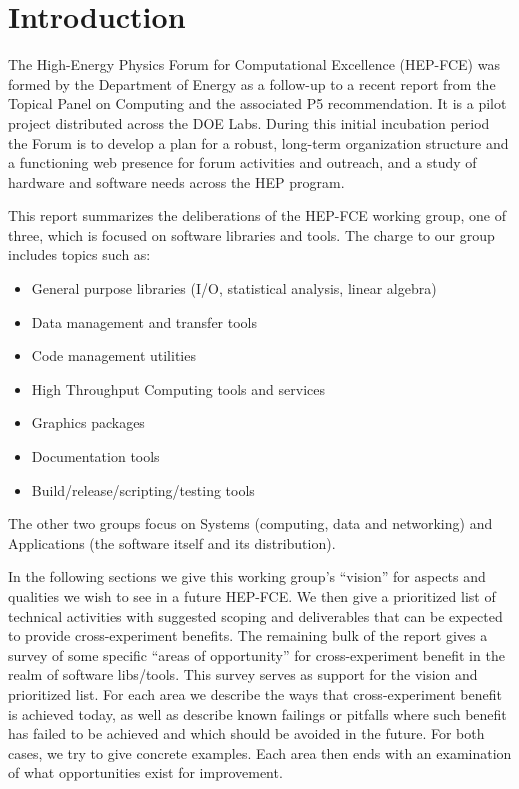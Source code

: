 \section{Introduction}

The High-Energy Physics Forum for Computational Excellence (HEP-FCE)
was formed by the Department of Energy as a follow-up to a recent
report from the Topical Panel on Computing\cite{topicalpanel} and the
associated P5 recommendation\cite{p5}.
%
It is a  pilot project distributed across the DOE Labs.  
%
During this initial incubation period the Forum is to develop a plan
for a robust, long-term organization structure and a functioning web
presence for forum activities and outreach, and a study of hardware
and software needs across the HEP program.

This report summarizes the deliberations of the HEP-FCE working group,
one of three, which is focused on software libraries and tools.  The
charge to our group includes topics such as:

\begin{itemize}
\item General purpose libraries (I/O, statistical analysis, linear algebra)
\item  Data management and transfer tools
\item  Code management utilities
\item  High Throughput Computing tools and services
\item  Graphics packages
\item  Documentation tools
\item  Build/release/scripting/testing tools
\end{itemize}

The other two groups focus on Systems (computing, data and networking)
and Applications (the software itself and its distribution).   

In the following sections we give this working group's ``vision'' for
aspects and qualities we wish to see in a future HEP-FCE.  We then
give a prioritized list of technical activities with suggested scoping
and deliverables that can be expected to provide cross-experiment
benefits.  The remaining bulk of the report gives a survey of some
specific ``areas of opportunity'' for cross-experiment benefit in the
realm of software libs/tools.  This survey serves as support for the
vision and prioritized list.  For each area we describe the ways that
cross-experiment benefit is achieved today, as well as describe known
failings or pitfalls where such benefit has failed to be achieved and
which should be avoided in the future.  For both cases, we try to give
concrete examples.  Each area then ends with an examination of what
opportunities exist for improvement.


